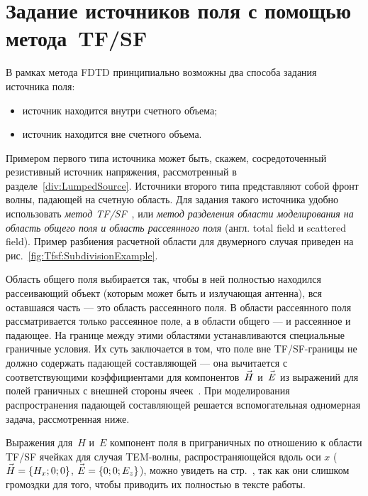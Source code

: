 %
%
%
\section{Задание источников поля с помощью метода~TF/SF}

В рамках метода FDTD принципиально возможны два способа задания источника поля:
\begin{itemize}
\item источник находится внутри счетного объема;
\item источник находится вне счетного объема.
\end{itemize}
Примером первого типа источника может быть, скажем, сосредоточенный резистивный
источник напряжения, рассмотренный в разделе~\ref{div:LumpedSource}. Источники
второго типа представляют собой фронт волны, падающей на счетную область. Для
задания такого источника удобно использовать
\emph{метод TF/SF}~\cite{bib:Taflove1995,bib:Davidson2005,bib:Berenger1994,
bib:Berenger1996}, или \emph{метод разделения области моделирования на область
общего поля и область рассеянного поля} (англ. total field и scattered field).
Пример разбиения расчетной области для двумерного случая приведен на
рис.~\ref{fig:Tfsf:SubdivisionExample}.

Область общего поля выбирается так, чтобы в ней полностью находился рассеивающий
объект (которым может быть и излучающая антенна), вся оставшаяся часть --- это
область рассеянного поля. В области рассеянного поля рассматривается только
рассеянное поле, а в области общего --- и рассеянное и падающее. На границе
между этими областями устанавливаются специальные граничные условия. Их суть
заключается в том, что поле вне TF/SF-границы не должно содержать падающей
составляющей --- она вычитается с соответствующими коэффициентами для
компонентов~$\vec{H\mathstrut}$ и~$\vec{E\mathstrut}$ из выражений для полей граничных с внешней
стороны ячеек~\cite{bib:Bogolyubov2006}. При моделирования распространения
падающей составляющей решается вспомогательная одномерная задача, рассмотренная
ниже.

Выражения для~$H$ и~$E$ компонент поля в приграничных по отношению к области
TF/SF ячейках для случая TEM-волны, распространяющейся вдоль оси $x$
($\vec{H\mathstrut}=\{H_x;0;0\}$, $\vec{E\mathstrut}=\{0;0;E_z\}$), можно увидеть на
стр.~\pageref{eq:Tfsf:BasicEquationsOnSeparatePage}, так как они слишком
громоздки для того, чтобы приводить их полностью в тексте работы.

